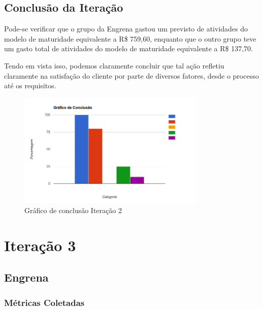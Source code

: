 \subsection{Conclusão da Iteração}

Pode-se verificar que o grupo da Engrena gastou um previsto de atividades do modelo de maturidade equivalente a R\$ 759,60, enquanto que o outro grupo teve um gasto total de atividades do modelo de maturidade equivalente a R\$ 137,70.

Tendo em vista isso, podemos claramente concluir que tal ação refletiu claramente na satisfação do cliente por parte de diversos fatores, desde o processo até os requisitos.

\begin{figure}[H]
  \center
  \includegraphics[width=0.8\textwidth]{figuras/plot2}
  \caption{Gráfico de conclusão Iteração 2}
  \label{fig:plot2}
\end{figure}

\section{Iteração 3}

\subsection{Engrena}

\subsubsection{Métricas Coletadas}

